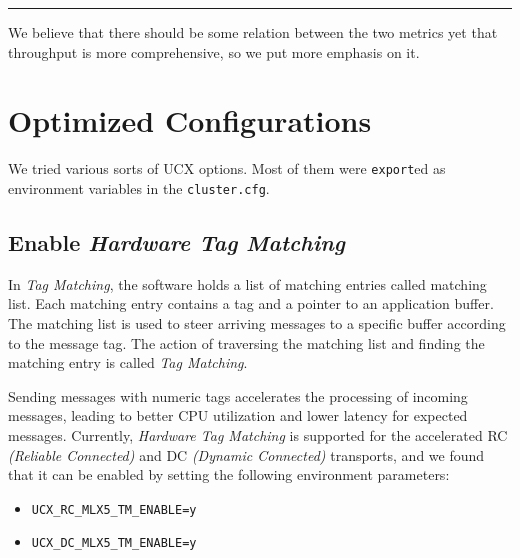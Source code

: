 \documentclass{article}
\begin{document}
\rule{\linewidth}{.64px}

We believe that there should be some relation between the two metrics yet that throughput is more comprehensive, so we put more emphasis on it.

\section{Optimized Configurations}

We tried various sorts of \textsf{UCX} options. Most of them were \texttt{export}ed as environment variables in the \texttt{cluster.cfg}.




\subsection{Enable \textit{Hardware Tag Matching}}

In \textit{Tag Matching}, the software holds a list of matching entries called matching list. Each matching entry contains a tag and a pointer to an application buffer. The matching list is used to steer arriving messages to a specific buffer according to the message tag. The action of traversing the matching list and finding the matching entry is called \textit{Tag Matching}.

Sending messages with numeric tags accelerates the processing of incoming messages, leading to better CPU utilization and lower latency for expected messages. Currently, \textit{Hardware Tag Matching} is supported for the accelerated RC \textit{(Reliable Connected)} and DC \textit{(Dynamic Connected)} transports, and we found that it can be enabled by setting the following environment parameters:
\begin{itemize}
	\item \texttt{UCX\_RC\_MLX5\_TM\_ENABLE=y}
	\item \texttt{UCX\_DC\_MLX5\_TM\_ENABLE=y}
\end{itemize}
\end{document}
